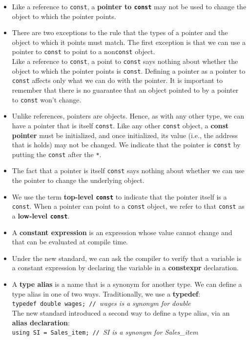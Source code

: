 \begin{itemize}
\item Like a reference to \texttt{const}, a \textbf{pointer to \texttt{const}} may not be used to change the object to which the pointer points.

\item There are two exceptions to the rule that the types of a pointer and the object to which it points must match. The first exception is that we can use a pointer to \texttt{const} to point to a non\texttt{const} object.\\Like a reference to \texttt{const}, a point to \texttt{const} says nothing about whether the object to which the pointer points is \texttt{const}. Defining a pointer as a pointer to \texttt{const} affects only what we can do with the pointer. It is important to remember that there is no guarantee that an object pointed to by a pointer to \texttt{const} won't change.

\item Unlike references, pointers are objects. Hence, as with any other type, we can have a pointer that is itself \texttt{const}. Like any other \texttt{const} object, a \textbf{const pointer} must be initialized, and once initialized, its value (i.e., the address that is holds) may not be changed. We indicate that the pointer is \texttt{const} by putting the \texttt{const} after the \texttt{*}.

\item The fact that a pointer is itself \texttt{const} says nothing about whether we can use the pointer to change the underlying object.

\item We use the term \textbf{top-level \texttt{const}} to indicate that the pointer itself is a \texttt{const}. When a pointer can point to a \texttt{const} object, we refer to that \texttt{const} as a \textbf{low-level \texttt{const}}.

\item A \textbf{constant expression} is an expression whose value cannot change and that can be evaluated at compile time.

\item Under the new standard, we can ask the compiler to verify that a variable is a constant expression by declaring the variable in a \textbf{constexpr} declaration.

\item A \textbf{type alias} is a name that is a synonym for another type. We can define a type alias in one of two ways. Traditionally, we use a \textbf{typedef}:\\\hspace*{1em}\texttt{typedef double wages; // }\textit{wages is a synonym for double}\\The new standard introduced a second way to define a type alias, via an \textbf{alias declaration}:\\\hspace*{1em}\texttt{using SI = Sales\_item; // }\textit{SI is a synonym for Sales\_item}


\end{itemize}
